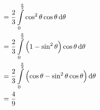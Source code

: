 \documentclass[fleqn, a4paper, 12pt, twoside]{article}
\theoremstyle{definition}
\theoremstyle{theorem}
\begin{document}
\begin{solution}
\begin{align*}
                                                     & = \frac{2}{3} \int\limits_{0}^{\frac{\pi}{2}} \cos^2 \theta \cos \theta \dif \theta                              \\
                                                     & = \frac{2}{3} \int\limits_{0}^{\frac{\pi}{2}} \left( 1 - \sin^2 \theta \right) \cos \theta \dif \theta           \\
                                                     & = \frac{2}{3} \int\limits_{0}^{\frac{\pi}{2}} \left( \cos \theta - \sin^2 \theta \cos \theta \right) \dif \theta \\
                                                     & = \frac{4}{9}
	\end{align*}
\end{solution}
\end{document}
